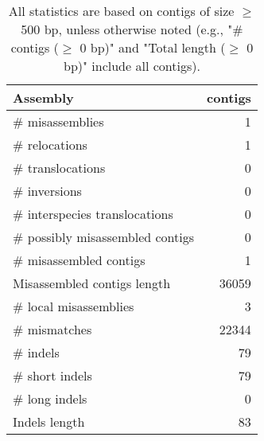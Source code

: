 \documentclass[12pt,a4paper]{article}
\begin{document}
\begin{table}[ht]
\begin{center}
\caption{All statistics are based on contigs of size $\geq$ 500 bp, unless otherwise noted (e.g., "\# contigs ($\geq$ 0 bp)" and "Total length ($\geq$ 0 bp)" include all contigs).}
\begin{tabular}{|l*{1}{|r}|}
\hline
Assembly & contigs \\ \hline
\# misassemblies & 1 \\ \hline
\hspace{5mm}\# relocations & 1 \\ \hline
\hspace{5mm}\# translocations & 0 \\ \hline
\hspace{5mm}\# inversions & 0 \\ \hline
\hspace{5mm}\# interspecies translocations & 0 \\ \hline
\# possibly misassembled contigs & 0 \\ \hline
\# misassembled contigs & 1 \\ \hline
Misassembled contigs length & 36059 \\ \hline
\# local misassemblies & 3 \\ \hline
\# mismatches & 22344 \\ \hline
\# indels & 79 \\ \hline
\hspace{5mm}\# short indels & 79 \\ \hline
\hspace{5mm}\# long indels & 0 \\ \hline
Indels length & 83 \\ \hline
\end{tabular}
\end{center}
\end{table}
\end{document}
